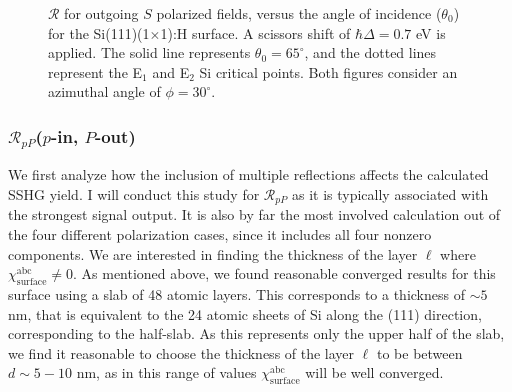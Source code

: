 \begin{figure}[t]
\centering
{}\hfill
{}
\caption[Overview of the angular dependence of $\mathcal{R}_{\mathrm{iS}}$.]
{$\mathcal{R}$ for outgoing $S$ polarized fields, versus the angle of
incidence ($\theta_{0}$) for the Si(111)(1$\times$1):H surface. A scissors shift
of $\hbar\Delta = 0.7$ eV is applied. The solid line represents $\theta_{0} =
65^{\circ}$, and the dotted lines represent the E$_{1}$ and E$_{2}$ Si critical
points. Both figures consider an azimuthal angle of $\phi = 30^{\circ}$.}
\label{fig:1x1rS3d}
\end{figure}



\subsubsection{\texorpdfstring{$\mathcal{R}_{pP}$}{RpP}($p$-in, $P$-out)}
\label{sec:1x1RpP}

We first analyze how the inclusion of multiple reflections affects the
calculated SSHG yield. I will conduct this study for $\mathcal{R}_{pP}$ as it is
typically associated with the strongest signal output. It is also by far the
most involved calculation out of the four different polarization cases, since it
includes all four nonzero components. We are interested in finding the thickness
of the layer $\ell$ where $\chi^{\mathrm{abc}}_{\mathrm{surface}} \ne 0$. As
mentioned above, we found reasonable converged results for this surface using a
slab of 48 atomic layers. This corresponds to a thickness of $\sim 5$ nm, that
is equivalent to the 24 atomic sheets of Si along the (111) direction,
corresponding to the half-slab. As this represents only the upper half of the
slab, we find it reasonable to choose the thickness of the layer $\ell$ to be
between $d\sim 5-10$ nm, as in this range of values
$\chi^{\mathrm{abc}}_{\mathrm{surface}}$ will be well converged.

